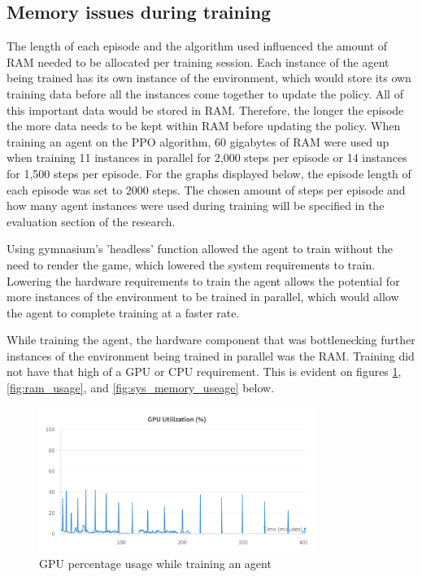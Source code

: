 \subsection{Memory issues during training}

The length of each episode and the algorithm used influenced the amount of RAM needed to be allocated per training session. Each instance of the agent being trained has its own instance of the environment, which would store its own training data before all the instances come together to update the policy. All of this important data would be stored in RAM. Therefore, the longer the episode the more data needs to be kept within RAM before updating the policy. When training an agent on the PPO algorithm, 60 gigabytes of RAM were used up when training 11 instances in parallel for 2,000 steps per episode or 14 instances for 1,500 steps per episode. For the graphs displayed below, the episode length of each episode was set to 2000 steps. The chosen amount of steps per episode and how many agent instances were used during training will be specified in the evaluation section of the research. 

Using gymnasium's 'headless' function allowed the agent to train without the need to render the game, which lowered the system requirements to train. Lowering the hardware requirements to train the agent allows the potential for more instances of the environment to be trained in parallel, which would allow the agent to complete training at a faster rate.

While training the agent, the hardware component that was bottlenecking further instances of the environment being trained in parallel was the RAM. Training did not have that high of a GPU or CPU requirement. This is evident on figures \ref{fig:gpu_memory_usage}, \ref{fig:ram_usage}, and \ref{fig:sys_memory_useage} below. 

\begin{figure}[H]
    \centering
    \includegraphics[width=0.8\textwidth]{figures/GPU_Utilization.png}
    \caption{GPU percentage usage while training an agent}
    \label{fig:gpu_memory_usage}
\end{figure}


